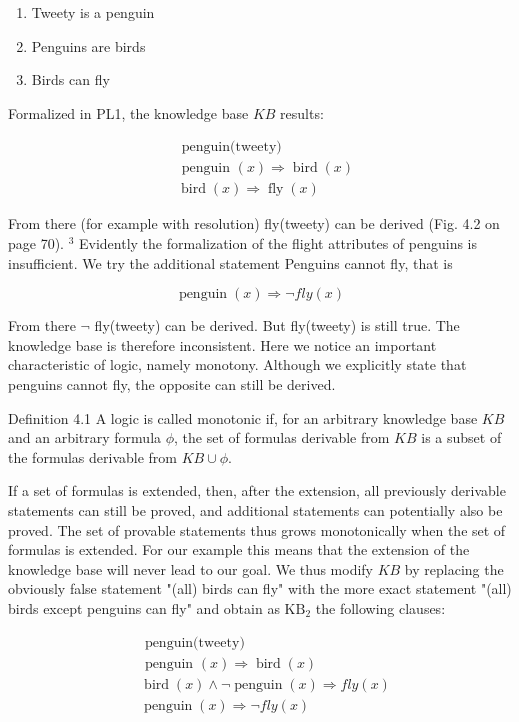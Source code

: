 \documentclass[10pt]{article}
\begin{document}
\begin{enumerate}
  \item Tweety is a penguin
  \item Penguins are birds
  \item Birds can fly
\end{enumerate}

Formalized in PL1, the knowledge base $K B$ results:

$$
\begin{aligned}
& \text { penguin(tweety) } \\
& \text { penguin }(x) \Rightarrow \operatorname{bird}(x) \\
& \operatorname{bird}(x) \Rightarrow \operatorname{fly}(x)
\end{aligned}
$$

From there (for example with resolution) fly(tweety) can be derived (Fig. 4.2 on page 70). ${ }^{3}$ Evidently the formalization of the flight attributes of penguins is insufficient. We try the additional statement Penguins cannot fly, that is

$$
\operatorname{penguin}(x) \Rightarrow \neg f l y(x)
$$

From there $\neg$ fly(tweety) can be derived. But fly(tweety) is still true. The knowledge base is therefore inconsistent. Here we notice an important characteristic of logic, namely monotony. Although we explicitly state that penguins cannot fly, the opposite can still be derived.

Definition 4.1 A logic is called monotonic if, for an arbitrary knowledge base $K B$ and an arbitrary formula $\phi$, the set of formulas derivable from $K B$ is a subset of the formulas derivable from $K B \cup \phi$.

If a set of formulas is extended, then, after the extension, all previously derivable statements can still be proved, and additional statements can potentially also be proved. The set of provable statements thus grows monotonically when the set of formulas is extended. For our example this means that the extension of the knowledge base will never lead to our goal. We thus modify $K B$ by replacing the obviously false statement "(all) birds can fly" with the more exact statement "(all) birds except penguins can fly" and obtain as $\mathrm{KB}_{2}$ the following clauses:

$$
\begin{aligned}
& \text { penguin(tweety) } \\
& \text { penguin }(x) \Rightarrow \operatorname{bird}(x) \\
& \operatorname{bird}(x) \wedge \neg \operatorname{penguin}(x) \Rightarrow f l y(x) \\
& \operatorname{penguin}(x) \Rightarrow \neg f l y(x)
\end{aligned}
$$
\end{document}
